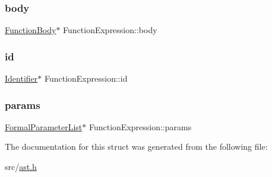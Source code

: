 \subsubsection{\texorpdfstring{body}{body}}
{\footnotesize\ttfamily \hyperlink{struct_function_body}{Function\+Body}$\ast$ Function\+Expression\+::body}

\mbox{\label{struct_function_expression_a448321d33ff9d2603dfdb0b14cf4fe24}} 
\subsubsection{\texorpdfstring{id}{id}}
{\footnotesize\ttfamily \hyperlink{struct_identifier}{Identifier}$\ast$ Function\+Expression\+::id}

\mbox{\label{struct_function_expression_a5d02f2d692ae86ebdc36a3963042af65}} 
\subsubsection{\texorpdfstring{params}{params}}
{\footnotesize\ttfamily \hyperlink{struct_formal_parameter_list}{Formal\+Parameter\+List}$\ast$ Function\+Expression\+::params}



The documentation for this struct was generated from the following file\+:\begin{DoxyCompactItemize}
\item 
src/\hyperlink{ast_8h}{ast.\+h}\end{DoxyCompactItemize}
